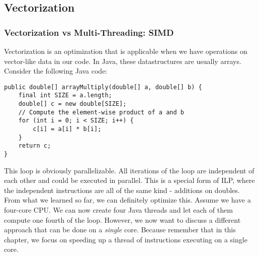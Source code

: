 \documentclass[main.tex]{subfiles}
\begin{document}
\subsection{Vectorization}
\label{vectorization}
\subsubsection{Vectorization vs Multi-Threading: SIMD}
Vectorization is an optimization that is applicable when we have operations on vector-like data in our code. In Java, these datastructures are usually arrays. Consider the following Java code:
\begin{verbatim}
public double[] arrayMultiply(double[] a, double[] b) {
    final int SIZE = a.length;
    double[] c = new double[SIZE];
    // Compute the element-wise product of a and b
    for (int i = 0; i < SIZE; i++) {
        c[i] = a[i] * b[i];
    }
    return c;
}
\end{verbatim}
This loop is obviously parallelizable. All iterations of the loop are independent of each other and could be executed in parallel. This is a special form of ILP, where the independent instructions are all of the same kind - additions on doubles. From what we learned so far, we can definitely optimize this. Assume we have a four-core CPU. We can now create four Java threads and let each of them compute one fourth of the loop. However, we now want to discuss a different approach that can be done on a \textit{single} core. Because remember that in this chapter, we focus on speeding up a thread of instructions executing on a single core.
\end{document}
